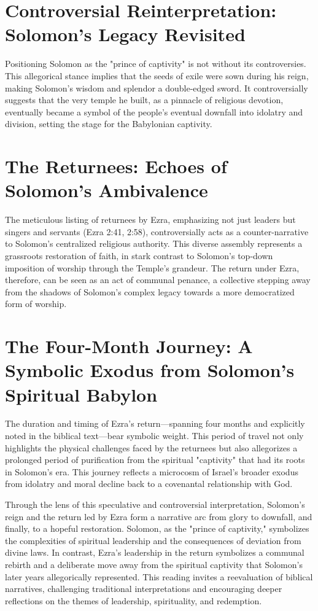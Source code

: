 \section{Controversial Reinterpretation: Solomon's Legacy Revisited}

Positioning Solomon as the "prince of captivity" is not without its controversies. This allegorical stance implies that the seeds of exile were sown during his reign, making Solomon's wisdom and splendor a double-edged sword. It controversially suggests that the very temple he built, as a pinnacle of religious devotion, eventually became a symbol of the people's eventual downfall into idolatry and division, setting the stage for the Babylonian captivity.

\section{The Returnees: Echoes of Solomon's Ambivalence}

The meticulous listing of returnees by Ezra, emphasizing not just leaders but singers and servants (Ezra 2:41, 2:58), controversially acts as a counter-narrative to Solomon's centralized religious authority. This diverse assembly represents a grassroots restoration of faith, in stark contrast to Solomon's top-down imposition of worship through the Temple's grandeur. The return under Ezra, therefore, can be seen as an act of communal penance, a collective stepping away from the shadows of Solomon's complex legacy towards a more democratized form of worship.

\section{The Four-Month Journey: A Symbolic Exodus from Solomon's Spiritual Babylon}

The duration and timing of Ezra's return—spanning four months and explicitly noted in the biblical text—bear symbolic weight. This period of travel not only highlights the physical challenges faced by the returnees but also allegorizes a prolonged period of purification from the spiritual "captivity" that had its roots in Solomon's era. This journey reflects a microcosm of Israel's broader exodus from idolatry and moral decline back to a covenantal relationship with God.


Through the lens of this speculative and controversial interpretation, Solomon's reign and the return led by Ezra form a narrative arc from glory to downfall, and finally, to a hopeful restoration. Solomon, as the "prince of captivity," symbolizes the complexities of spiritual leadership and the consequences of deviation from divine laws. In contrast, Ezra's leadership in the return symbolizes a communal rebirth and a deliberate move away from the spiritual captivity that Solomon's later years allegorically represented. This reading invites a reevaluation of biblical narratives, challenging traditional interpretations and encouraging deeper reflections on the themes of leadership, spirituality, and redemption.

